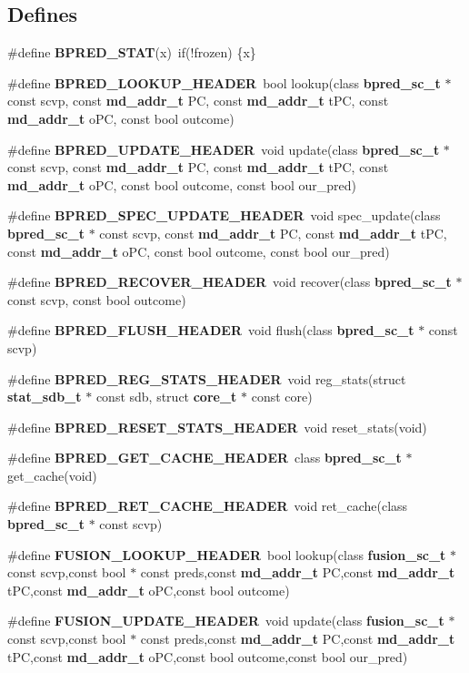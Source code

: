 \subsection*{Defines}
\begin{CompactItemize}
\item 
\#define {\bf BPRED\_\-STAT}(x)~if(!frozen) \{x\}
\item 
\#define {\bf BPRED\_\-LOOKUP\_\-HEADER}~bool lookup(class {\bf bpred\_\-sc\_\-t} $\ast$ const scvp, const {\bf md\_\-addr\_\-t} PC, const {\bf md\_\-addr\_\-t} tPC, const {\bf md\_\-addr\_\-t} oPC, const bool outcome)
\item 
\#define {\bf BPRED\_\-UPDATE\_\-HEADER}~void update(class {\bf bpred\_\-sc\_\-t} $\ast$ const scvp, const {\bf md\_\-addr\_\-t} PC, const {\bf md\_\-addr\_\-t} tPC, const {\bf md\_\-addr\_\-t} oPC, const bool outcome, const bool our\_\-pred)
\item 
\#define {\bf BPRED\_\-SPEC\_\-UPDATE\_\-HEADER}~void spec\_\-update(class {\bf bpred\_\-sc\_\-t} $\ast$ const scvp, const {\bf md\_\-addr\_\-t} PC, const {\bf md\_\-addr\_\-t} tPC, const {\bf md\_\-addr\_\-t} oPC, const bool outcome, const bool our\_\-pred)
\item 
\#define {\bf BPRED\_\-RECOVER\_\-HEADER}~void recover(class {\bf bpred\_\-sc\_\-t} $\ast$ const scvp, const bool outcome)
\item 
\#define {\bf BPRED\_\-FLUSH\_\-HEADER}~void flush(class {\bf bpred\_\-sc\_\-t} $\ast$ const scvp)
\item 
\#define {\bf BPRED\_\-REG\_\-STATS\_\-HEADER}~void reg\_\-stats(struct {\bf stat\_\-sdb\_\-t} $\ast$ const sdb, struct {\bf core\_\-t} $\ast$ const core)
\item 
\#define {\bf BPRED\_\-RESET\_\-STATS\_\-HEADER}~void reset\_\-stats(void)
\item 
\#define {\bf BPRED\_\-GET\_\-CACHE\_\-HEADER}~class {\bf bpred\_\-sc\_\-t} $\ast$ get\_\-cache(void)
\item 
\#define {\bf BPRED\_\-RET\_\-CACHE\_\-HEADER}~void ret\_\-cache(class {\bf bpred\_\-sc\_\-t} $\ast$ const scvp)
\item 
\#define {\bf FUSION\_\-LOOKUP\_\-HEADER}~bool lookup(class {\bf fusion\_\-sc\_\-t} $\ast$ const scvp,const bool $\ast$ const preds,const {\bf md\_\-addr\_\-t} PC,const {\bf md\_\-addr\_\-t} tPC,const {\bf md\_\-addr\_\-t} oPC,const bool outcome)
\item 
\#define {\bf FUSION\_\-UPDATE\_\-HEADER}~void update(class {\bf fusion\_\-sc\_\-t} $\ast$ const scvp,const bool $\ast$ const preds,const {\bf md\_\-addr\_\-t} PC,const {\bf md\_\-addr\_\-t} tPC,const {\bf md\_\-addr\_\-t} oPC,const bool outcome,const bool our\_\-pred)

\end{CompactItemize}
